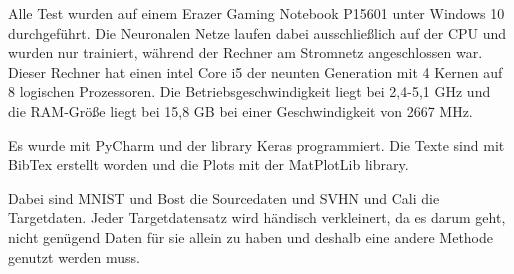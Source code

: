 Alle Test wurden auf einem Erazer Gaming Notebook P15601 unter Windows 10 durchgeführt.
Die Neuronalen Netze laufen dabei ausschließlich auf 
der CPU und wurden nur trainiert, während der Rechner am Stromnetz angeschlossen war. 
Dieser Rechner hat einen intel Core i5 der neunten Generation mit 4 Kernen auf 8 
logischen Prozessoren. Die Betriebsgeschwindigkeit liegt bei 2,4-5,1 GHz und die 
RAM-Größe liegt bei 15,8 GB bei einer Geschwindigkeit von 2667 MHz. 

Es wurde mit PyCharm und der library Keras programmiert. Die Texte sind mit BibTex 
erstellt worden und die Plots mit der MatPlotLib library.

Dabei sind MNIST und Bost die Sourcedaten und SVHN und Cali die Targetdaten. Jeder Targetdatensatz 
wird händisch verkleinert, da es darum geht, nicht genügend Daten für sie allein zu haben und deshalb eine andere 
Methode genutzt werden muss.
